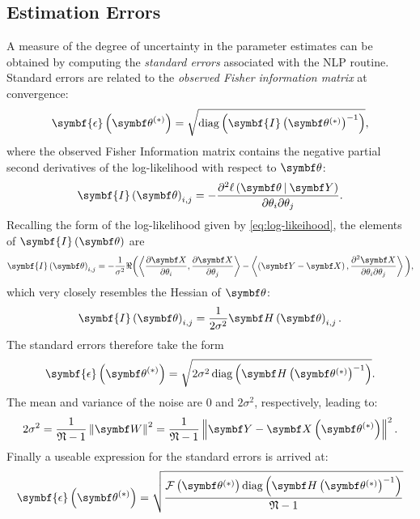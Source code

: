 \subsection{Estimation Errors}
\label{subsec:errors}
A measure of the degree of uncertainty in the parameter estimates can be obtained
by computing the \emph{standard errors} associated with the \ac{NLP} routine.
Standard errors are related  to the \emph{observed Fisher information matrix}
at convergence\cite[Section 2.7]{Pawitan2001}:
\begin{equation}
    \symbf{\epsilon}\left(\bthstar\right) = \sqrt{\diag\left(\symbf{I}\left( \bthstar \right)^{-1}\right)},
\end{equation}
where the observed Fisher Information matrix contains the negative partial second
derivatives of the log-likelihood with respect to $\bth$:
\begin{equation}
    \symbf{I}\left(\bth\right)_{i, j} =
        -\frac
        {\partial^2 \ell \left( \bdthY \right)}
        {\partial \theta_i \partial \theta_j}.
\end{equation}
Recalling the form of the log-likelihood given by \cref{eq:log-likeihood},
the elements of $\symbf{I}\left(\bth\right)$ are
\begin{equation}
    \symbf{I}\left(\bth\right)_{i, j} =
        -\frac{1}{\sigma^2}
        \Re
        \biggl(
            \left\langle
                \frac{\partial \bX}{\partial \theta_i},
                \frac{\partial \bX}{\partial \theta_j}
            \right\rangle
            -
            \left\langle
                \left(\bY - \bX\right),
                \frac{\partial^2 \bX}{\partial \theta_i \partial \theta_j}
            \right\rangle
        \biggl),
\end{equation}
which very closely resembles the Hessian of $\bth$:
\begin{equation}
    \symbf{I}\left(\bth\right)_{i,j} =
        \frac{1}{2 \sigma^2}
            \bdHth_{i,j}.
\end{equation}
The standard errors therefore take the form
\begin{equation}
    \symbf{\epsilon}\left(\bthstar\right) =
        \sqrt{
            2\sigma^2 \diag \left(
                \bdHthstar^{-1}
            \right)
        }.
\end{equation}
The mean and variance of the noise are $0$ and $2\sigma^2$, respectively,
leading to:
\begin{equation}
    2 \sigma^2 = \frac{1}{\mathfrak{N} - 1}
    \left\lVert \bW \right\rVert^2 =
    \frac{1}{\mathfrak{N} - 1} \left \lVert
        \bY - \bXthstar
    \right \rVert^2.
\end{equation}
Finally a useable expression for the standard errors is arrived at:
\begin{equation}
    \symbf{\epsilon}\left(\bthstar\right) =
        \sqrt{
            \frac
            {
                \Fthstar \diag \left(
                    \bdHthstar^{-1}
                \right)
            }
            {\mathfrak{N} - 1}
        }
\end{equation}

